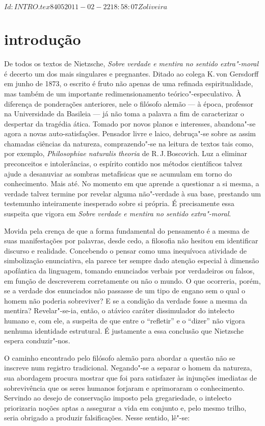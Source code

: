 \SVN $Id: INTRO.tex 8405 2011-02-22 18:58:07Z oliveira $ 

\chapter[Introdução, por Fernando de Moraes Barros]{introdução}

De todos os textos de Nietzsche, \textit{Sobre verdade e mentira no sentido
extra"-moral} é decerto um dos mais singulares e pregnantes. Ditado ao
colega K.\,von Gersdorff em junho de 1873, o escrito é fruto não apenas
de uma refinada espiritualidade, mas também de um importante
redimensionamento teórico"-especulativo. À diferença de ponderações
anteriores, nele o filósofo alemão --- à época, professor na Universidade
da Basileia --- já não toma a palavra a fim de caracterizar o despertar
da tragédia ática. Tomado por novos planos e interesses,
abandona"-se agora a novas auto{}-satisfações. Pensador livre e laico,
debruça"-se sobre as assim chamadas ciências da natureza,
comprazendo"-se na leitura de textos tais como, por exemplo,
\textit{Philosophiae naturalis theoria} de R.\,J.\,Boscovich. Luz a
eliminar preconceitos e intolerâncias, o espírito contido nos métodos científicos
talvez ajude a desanuviar as sombras metafísicas que se acumulam em
torno do conhecimento. Mais até. No momento em que aprende a questionar
a si mesma, a verdade talvez termine por revelar alguma não"-verdade à
sua base, prestando um testemunho inteiramente inesperado sobre si
própria. É precisamente essa suspeita que vigora em \textit{Sobre
verdade e mentira no sentido extra"-moral}.

Movida pela crença de que a forma fundamental do pensamento é a mesma
de suas manifestações por palavras, desde cedo, a filosofia não hesitou em
identificar discurso e realidade. Concebendo o pensar como uma
inequívoca atividade de simbolização enunciativa, ela parece ter sempre
dado atenção especial à dimensão apofântica da linguagem, tomando
enunciados verbais por verdadeiros ou falsos, em função de descreverem
corretamente ou não o mundo. O que ocorreria, porém, se a verdade dos
enunciados não passasse de um tipo de engano sem o qual o homem não
poderia sobreviver? E se a condição da verdade fosse a mesma da
mentira? Revelar"-se{}-ia, então, o atávico caráter dissimulador do
intelecto humano e, com ele, a suspeita de que entre o “refletir” e o
“dizer” não vigora nenhuma identidade estrutural. É justamente a essa
conclusão que Nietzsche espera conduzir"-nos.

O caminho encontrado pelo filósofo alemão para abordar a questão
não se inscreve num registro tradicional.
Negando"-se a
separar o homem da natureza, sua abordagem procura mostrar que foi para
satisfazer às injunções imediatas de sobrevivência que os seres humanos
forjaram e aprimoraram o conhecimento. Servindo ao desejo de
conservação imposto pela gregariedade, o intelecto priorizaria noções
aptas a assegurar a vida em conjunto e, pelo mesmo trilho, 
seria obrigado a produzir falsificações. Nesse sentido, 
lê"-se: 

